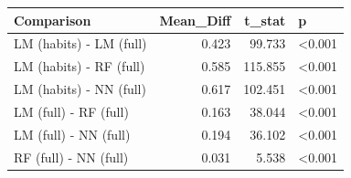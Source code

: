 
\begin{tabular}{lrrl}
\toprule
Comparison & Mean\_Diff & t\_stat & p\\
\midrule
LM (habits) - LM (full) & 0.423 & 99.733 & <0.001\\
LM (habits) - RF (full) & 0.585 & 115.855 & <0.001\\
LM (habits) - NN (full) & 0.617 & 102.451 & <0.001\\
LM (full) - RF (full) & 0.163 & 38.044 & <0.001\\
LM (full) - NN (full) & 0.194 & 36.102 & <0.001\\
RF (full) - NN (full) & 0.031 & 5.538 & <0.001\\
\bottomrule
\end{tabular}

